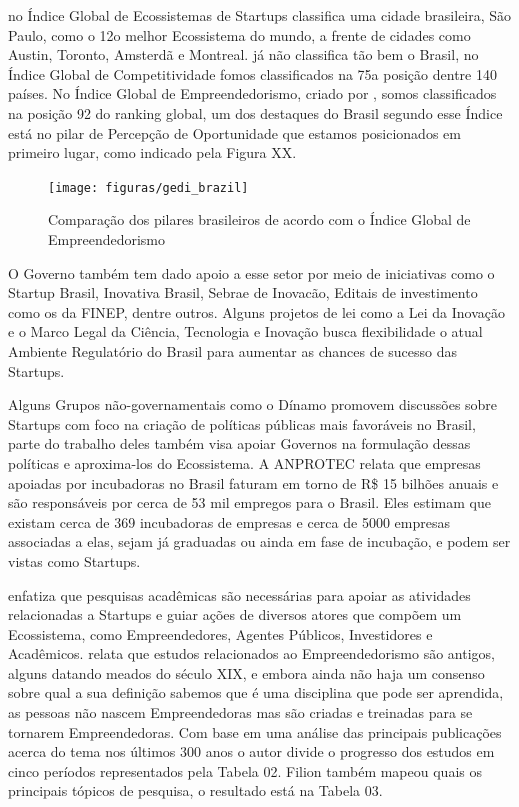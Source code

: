  no Índice Global de Ecossistemas de Startups classifica uma cidade brasileira, São Paulo, como o 12o melhor Ecossistema do mundo, a frente de cidades como Austin, Toronto, Amsterdã e Montreal.  já não classifica tão bem o Brasil, no Índice Global de Competitividade fomos classificados na 75a posição dentre 140 países. No Índice Global de Empreendedorismo, criado por , somos classificados na posição 92 do ranking global, um dos destaques do Brasil segundo esse Índice está no pilar de Percepção de Oportunidade que estamos posicionados em primeiro lugar, como indicado pela Figura XX.

\begin{figure}[!htb]
	\centering
	\texttt{[image: figuras/gedi\_brazil]}
	\caption{Comparação dos pilares brasileiros de acordo com o Índice Global de Empreendedorismo}
	\label{figure:gedi_brazil}
\end{figure}

O Governo também tem dado apoio a esse setor por meio de iniciativas como o Startup Brasil, Inovativa Brasil, Sebrae de Inovacão, Editais de investimento como os da FINEP, dentre outros. Alguns projetos de lei como a Lei da Inovação e o Marco Legal da Ciência, Tecnologia e Inovação busca flexibilidade o atual Ambiente Regulatório do Brasil para aumentar as chances de sucesso das Startups. 

Alguns Grupos não-governamentais como o Dínamo promovem discussões sobre Startups com foco na criação de políticas públicas mais favoráveis no Brasil, parte do trabalho deles também visa apoiar Governos na formulação dessas políticas e aproxima-los do Ecossistema. A ANPROTEC relata que empresas apoiadas por incubadoras no Brasil faturam em torno de R\$ 15 bilhões anuais e são responsáveis por cerca de 53 mil empregos para o Brasil. Eles estimam que existam cerca de 369 incubadoras de empresas e cerca de 5000 empresas associadas a elas, sejam já graduadas ou ainda em fase de incubação, e podem ser vistas como Startups. 

 enfatiza que pesquisas acadêmicas são necessárias para apoiar as atividades relacionadas a Startups e guiar ações de diversos atores que compõem um Ecossistema, como Empreendedores, Agentes Públicos, Investidores e Acadêmicos.  relata que estudos relacionados ao Empreendedorismo são antigos, alguns datando meados do século XIX, e embora ainda não haja um consenso sobre qual a sua definição sabemos que é uma disciplina que pode ser aprendida, as pessoas não nascem Empreendedoras mas são criadas e treinadas para se tornarem Empreendedoras. Com base em uma análise das principais publicações acerca do tema nos últimos 300 anos o autor divide o progresso dos estudos em cinco períodos representados pela Tabela 02. Filion também mapeou quais os principais tópicos de pesquisa, o resultado está na Tabela 03.


